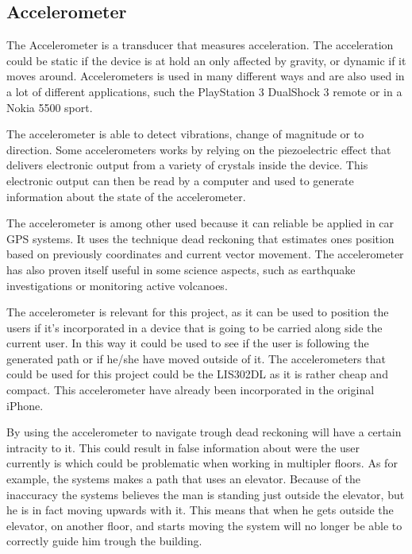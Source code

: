  
\subsection{Accelerometer}

The Accelerometer is a transducer that measures acceleration. The acceleration could be static if the device is at hold an only affected by gravity, or dynamic if it moves around\cite{acc_engi}. Accelerometers is used in many different ways and are also used in a lot of different applications, such the PlayStation 3 DualShock 3 remote\cite{acc_ps3} or in a Nokia 5500 sport\cite{acc_nokia}.


The accelerometer is able to detect vibrations, change of magnitude or to direction\cite{acc_engi}. Some accelerometers works by relying on the piezoelectric effect that delivers electronic output from a variety of crystals inside the device\cite{acc_piezo}. This electronic output can then be read by a computer and used to generate information about the state of the accelerometer.


The accelerometer is among other used because it can reliable be applied in car GPS systems. It uses the technique dead reckoning that estimates ones position based on previously coordinates and current vector movement\cite{acc_dead}. The accelerometer has also proven itself useful in some science aspects, such as earthquake investigations or monitoring active volcanoes\cite{acc_vulkan}. 


The accelerometer is relevant for this project, as it can be used to position the users if it's incorporated in a device that is going to be carried along side the current user. In this way it could be used to see if the user is following the generated path or if he/she have moved outside of it. The accelerometers that could be used for this project could be the LIS302DL as it is rather cheap and compact\cite{acc_price}\cite{acc_LIS302DL}. This accelerometer have already been incorporated in the original iPhone\cite{acc_iPhone}.


By using the accelerometer to navigate trough dead reckoning will have a certain intracity to it\cite{acc_inacc}. This could result in false information about were the user currently is which could be problematic when working in multipler floors. As for example, the systems makes a path that uses an elevator. Because of the inaccuracy the systems believes the man is standing just outside the elevator, but he is in fact moving upwards with it. This means that when he gets outside the elevator, on another floor, and starts moving the system will no longer be able to correctly guide him trough the building. 
